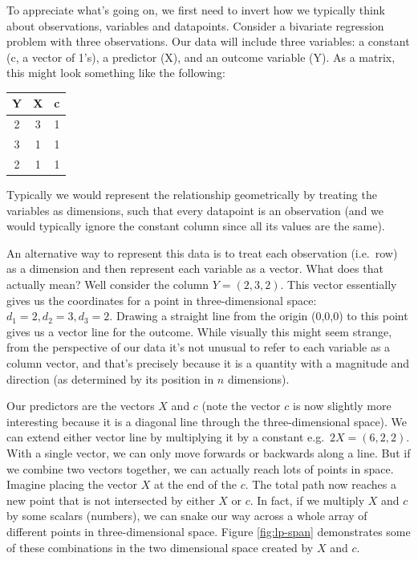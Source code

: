 \documentclass[
]{book}
\begin{document}
To appreciate what's going on, we first need to invert how we typically think about observations, variables and datapoints. Consider a bivariate regression problem with three observations. Our data will include three variables: a constant (c, a vector of 1's), a predictor (X), and an outcome variable (Y). As a matrix, this might look something like the following:

\begin{longtable}[]{@{}ccc@{}}
\toprule
Y & X & c\tabularnewline
\midrule
\endhead
2 & 3 & 1\tabularnewline
3 & 1 & 1\tabularnewline
2 & 1 & 1\tabularnewline
\bottomrule
\end{longtable}

Typically we would represent the relationship geometrically by treating the variables as dimensions, such that every datapoint is an observation (and we would typically ignore the constant column since all its values are the same).

An alternative way to represent this data is to treat each observation (i.e.~row) as a dimension and then represent each variable as a vector. What does that actually mean? Well consider the column \(Y = (2,3,2)\). This vector essentially gives us the coordinates for a point in three-dimensional space: \(d_1 = 2, d_2 = 3, d_3 = 2\). Drawing a straight line from the origin (0,0,0) to this point gives us a vector line for the outcome. While visually this might seem strange, from the perspective of our data it's not unusual to refer to each variable as a column vector, and that's precisely because it is a quantity with a magnitude and direction (as determined by its position in \(n\) dimensions).

Our predictors are the vectors \(X\) and \(c\) (note the vector \(c\) is now slightly more interesting because it is a diagonal line through the three-dimensional space). We can extend either vector line by multiplying it by a constant e.g.~\(2X = (6,2,2)\). With a single vector, we can only move forwards or backwards along a line. But if we combine two vectors together, we can actually reach lots of points in space. Imagine placing the vector \(X\) at the end of the \(c\). The total path now reaches a new point that is not intersected by either \(X\) or \(c\). In fact, if we multiply \(X\) and \(c\) by some scalars (numbers), we can snake our way across a whole array of different points in three-dimensional space. Figure \ref{fig:lp-span} demonstrates some of these combinations in the two dimensional space created by \(X\) and \(c\).
\end{document}
